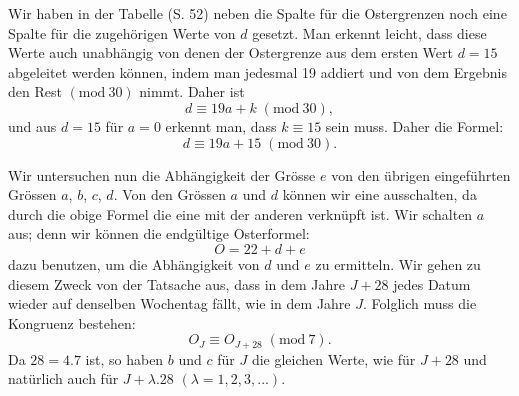 Wir haben in der Tabelle (S. 52) neben die Spalte für die Ostergrenzen
noch eine Spalte für die zugehörigen Werte von $d$ gesetzt. Man erkennt
leicht, dass diese Werte auch unabhängig von denen der Ostergrenze aus dem
ersten Wert $d=15$ abgeleitet werden können, indem man jedesmal 19 addiert und von dem Ergebnis den Rest $(\mathrm{mod}\ 30)$ nimmt. Daher ist
\[
d\equiv19a+k\; (\mathrm{mod}\ 30),
\]
\noindent und aus $d=15$ für $a=0$ erkennt man, dass $k\equiv15$ sein muss. Daher die
Formel:
\[
d\equiv19a+15\; (\mathrm{mod}\ 30).
\]

Wir untersuchen nun die Abhängigkeit der Grösse $e$ von den übrigen
eingeführten Grössen $a$, $b$, $c$, $d$. Von den Grössen $a$ und $d$ können wir eine
ausschalten, da durch die obige Formel die eine mit der anderen verknüpft
ist. Wir schalten $a$ aus; denn wir können die endgültige Osterformel:
\[
O=22+d+e
\]
\noindent dazu benutzen, um die Abhängigkeit von $d$ und $e$ zu ermitteln. Wir gehen
zu diesem Zweck von der Tatsache aus, dass in dem Jahre $J+28$ jedes Datum
wieder auf denselben Wochentag fällt, wie in dem Jahre $J$. Folglich muss
die Kongruenz bestehen:
\[
O_J\equiv O_{J+28}\; (\mathrm{mod}\ 7).
\]
\clearpage{}
\noindent Da $28=4\mathord{.}7$ ist, so haben $b$ und $c$ für $J$ die gleichen Werte, wie für $J+28$
und natürlich auch für $J+\lambda\mathord{.}28$ $(\lambda=1,2,3,\mathord{.}\mathord{.}\mathord{.})$.


